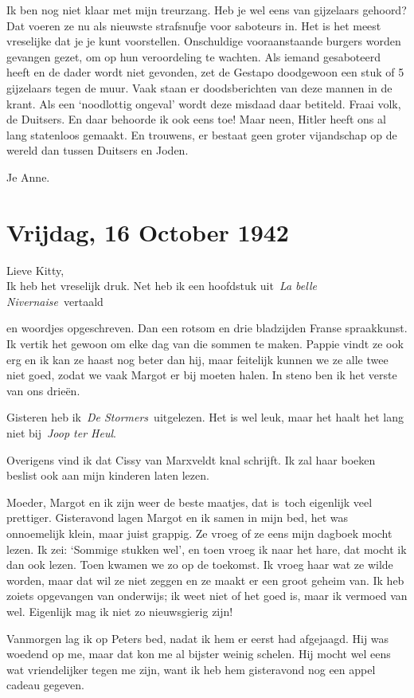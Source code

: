 \documentclass{book}
\begin{document}
Ik ben nog niet klaar met mijn treurzang. Heb je wel eens van gijzelaars
gehoord? Dat voeren ze nu als nieuwste strafsnufje voor saboteurs in.
Het is het meest vreselijke dat je je kunt voorstellen. Onschuldige
vooraanstaande burgers worden gevangen gezet, om op hun veroordeling te
wachten. Als iemand gesaboteerd heeft en de dader wordt niet gevonden,
zet de Gestapo doodgewoon een stuk of 5 gijzelaars tegen de muur. Vaak
staan er doodsberichten van deze mannen in de krant. Als een `noodlottig
ongeval' wordt deze misdaad daar betiteld. Fraai volk, de Duitsers. En
daar behoorde ik ook eens toe! Maar neen, Hitler heeft ons al lang
statenloos gemaakt. En trouwens, er bestaat geen groter vijandschap op
de wereld dan tussen Duitsers en Joden.

Je Anne.

\chapter{Vrijdag, 16 October 1942}

Lieve Kitty,\\Ik heb het vreselijk druk. Net heb ik een hoofdstuk
uit~\emph{La belle Nivernaise}~vertaald

en woordjes opgeschreven. Dan een rotsom en drie bladzijden Franse
spraakkunst. Ik vertik het gewoon om elke dag van die sommen te maken.
Pappie vindt ze ook erg en ik kan ze haast nog beter dan hij, maar
feitelijk kunnen we ze alle twee niet goed, zodat we vaak Margot er bij
moeten halen. In steno ben ik het verste van ons drieën.

Gisteren heb ik~\emph{De Stormers}~uitgelezen. Het is wel leuk, maar het
haalt het lang niet bij~\emph{Joop ter Heul}.

Overigens vind ik dat Cissy van Marxveldt knal schrijft. Ik zal haar
boeken beslist ook aan mijn kinderen laten lezen.

Moeder, Margot en ik zijn weer de beste maatjes, dat is~toch eigenlijk
veel prettiger. Gisteravond lagen Margot en ik samen in mijn bed, het
was onnoemelijk klein, maar juist grappig. Ze vroeg of ze eens mijn
dagboek mocht lezen. Ik zei: `Sommige stukken wel', en toen vroeg ik
naar het hare, dat mocht ik dan ook lezen. Toen kwamen we zo op de
toekomst. Ik vroeg haar wat ze wilde worden, maar dat wil ze niet zeggen
en ze maakt er een groot geheim van. Ik heb zoiets opgevangen van
onderwijs; ik weet niet of het goed is, maar ik vermoed van wel.
Eigenlijk mag ik niet zo nieuwsgierig zijn!

Vanmorgen lag ik op Peters bed, nadat ik hem er eerst had afgejaagd. Hij
was woedend op me, maar dat kon me al bijster weinig schelen. Hij mocht
wel eens wat vriendelijker tegen me zijn, want ik heb hem gisteravond
nog een appel cadeau gegeven.
\end{document}
